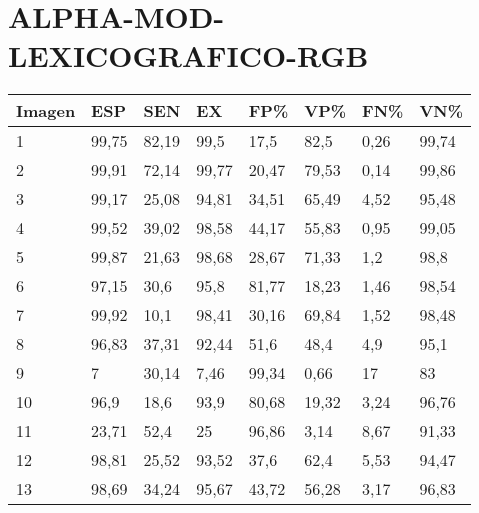\section{ALPHA-MOD-LEXICOGRAFICO-RGB}
\begin{longtable}[c]{|l|l|l|l|l|l|l|l|}
\hline
\textbf{Imagen} & \textbf{ESP} & \textbf{SEN} & \textbf{EX} & \textbf{FP\%} & \textbf{VP\%} & \textbf{FN\%} & \textbf{VN\%} \\ \hline
\endfirsthead
%
\endhead
%
1               & 99,75        & 82,19        & 99,5        & 17,5          & 82,5          & 0,26          & 99,74         \\ \hline
2               & 99,91        & 72,14        & 99,77       & 20,47         & 79,53         & 0,14          & 99,86         \\ \hline
3               & 99,17        & 25,08        & 94,81       & 34,51         & 65,49         & 4,52          & 95,48         \\ \hline
4               & 99,52        & 39,02        & 98,58       & 44,17         & 55,83         & 0,95          & 99,05         \\ \hline
5               & 99,87        & 21,63        & 98,68       & 28,67         & 71,33         & 1,2           & 98,8          \\ \hline
6               & 97,15        & 30,6         & 95,8        & 81,77         & 18,23         & 1,46          & 98,54         \\ \hline
7               & 99,92        & 10,1         & 98,41       & 30,16         & 69,84         & 1,52          & 98,48         \\ \hline
8               & 96,83        & 37,31        & 92,44       & 51,6          & 48,4          & 4,9           & 95,1          \\ \hline
9               & 7            & 30,14        & 7,46        & 99,34         & 0,66          & 17            & 83            \\ \hline
10              & 96,9         & 18,6         & 93,9        & 80,68         & 19,32         & 3,24          & 96,76         \\ \hline
11              & 23,71        & 52,4         & 25          & 96,86         & 3,14          & 8,67          & 91,33         \\ \hline
12              & 98,81        & 25,52        & 93,52       & 37,6          & 62,4          & 5,53          & 94,47         \\ \hline
13              & 98,69        & 34,24        & 95,67       & 43,72         & 56,28         & 3,17          & 96,83         \\ \hline

\end{longtable}
